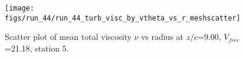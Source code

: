 \begin{figure}[H]
\centering
\texttt{[image: figs/run\_44/run\_44\_turb\_visc\_by\_vtheta\_vs\_r\_meshscatter]}
\caption{Scatter plot of mean total viscosity $\nu$ vs radius at $z/c$=9.00, $V_{free}$=21.18, station 5.}
\label{fig:run_44_turb_visc_by_vtheta_vs_r_meshscatter}
\end{figure}


